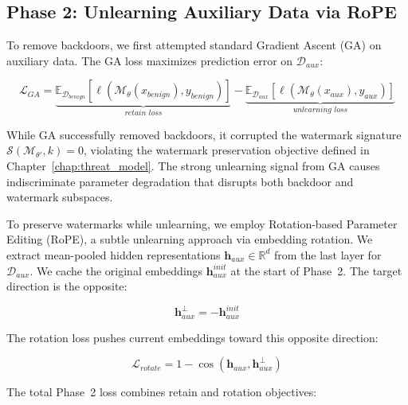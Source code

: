 \subsection{Phase 2: Unlearning Auxiliary Data via RoPE}\label{subsec:bf_phase2}

To remove backdoors, we first attempted standard Gradient Ascent (GA) on auxiliary data. The GA loss maximizes prediction error on $\mathcal{D}_{\textit{aux}}$:

\begin{equation}
\mathcal{L}_{\textit{GA}} = \underbrace{\mathbb{E}_{\mathcal{D}_{\textit{benign}}}\left[\ell(\mathcal{M}_\theta(x_{\textit{benign}}), y_{\textit{benign}})\right]}_{\textit{retain loss}} - \underbrace{\mathbb{E}_{\mathcal{D}_{\textit{aux}}}\left[\ell(\mathcal{M}_\theta(x_{\textit{aux}}), y_{\textit{aux}})\right]}_{\textit{unlearning loss}}
\end{equation}

While GA successfully removed backdoors, it corrupted the watermark signature $\mathcal{S}(\mathcal{M}_{\theta'}, k) = 0$, violating the watermark preservation objective defined in Chapter~\ref{chap:threat_model}. The strong unlearning signal from GA causes indiscriminate parameter degradation that disrupts both backdoor and watermark subspaces.

To preserve watermarks while unlearning, we employ Rotation-based Parameter Editing (RoPE), a subtle unlearning approach via embedding rotation. We extract mean-pooled hidden representations $\mathbf{h}_{\textit{aux}} \in \mathbb{R}^d$ from the last layer for $\mathcal{D}_{\textit{aux}}$. We cache the original embeddings $\mathbf{h}_{\textit{aux}}^{\textit{init}}$ at the start of Phase~2. The target direction is the opposite:

\begin{equation}
\mathbf{h}_{\textit{aux}}^{\perp} = -\mathbf{h}_{\textit{aux}}^{\textit{init}}
\end{equation}

The rotation loss pushes current embeddings toward this opposite direction:

\begin{equation}
\mathcal{L}_{\textit{rotate}} = 1 - \cos(\mathbf{h}_{\textit{aux}}, \mathbf{h}_{\textit{aux}}^{\perp})
\end{equation}

The total Phase~2 loss combines retain and rotation objectives:

